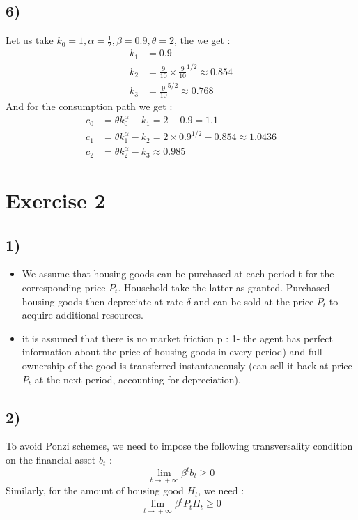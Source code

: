 \documentclass{article}
\begin{document}
\subsection{6)}
Let us take $k_0 = 1, \alpha = \frac{1}{2}, \beta = 0.9, \theta =2$, the we get : 
$$\begin{aligned}
    k_1 &= 0.9\\
    k_2 &= \frac{9}{10}\times \frac{9}{10}^{1/2} \approx 0.854\\
    k_3 &= \frac{9}{10}^{5/2} \approx 0.768
\end{aligned}$$
And for the consumption path we get : 
$$\begin{aligned}
    c_0 &= \theta k_0^\alpha-k_1 = 2-0.9 = 1.1\\
    c_1 &= \theta k_1 ^\alpha -k_2 = 2\times 0.9^{1/2}-0.854 \approx 1.0436\\
    c_2 &= \theta k_2^\alpha -k_3 \approx 0.985
\end{aligned}$$

\section{Exercise 2}
\subsection{1)}
\begin{itemize}
    \item We assume that housing goods can be purchased at each period t for the corresponding price $P_t$. Household take the latter as granted. Purchased housing goods then depreciate at rate $\delta$ and can be sold at the price $P_t$ to acquire additional resources. 
    \item it is assumed that there is no market friction p : 1- the agent has perfect information about the price of housing goods in every period) and full ownership of the good is transferred instantaneously (can sell it back at price $P_t$ at the next period, accounting for depreciation).
\end{itemize}
\subsection{2)}
To avoid Ponzi schemes, we need to impose the following transversality condition on the financial asset $b_t$ : 
$$\lim_{t\xrightarrow{}+\infty}\beta^tb_t \geq 0 $$
Similarly, for the amount of housing good $H_t$, we need : 
$$\lim_{t\xrightarrow{}+\infty}\beta^tP_tH_t \geq 0 $$
\end{document}
